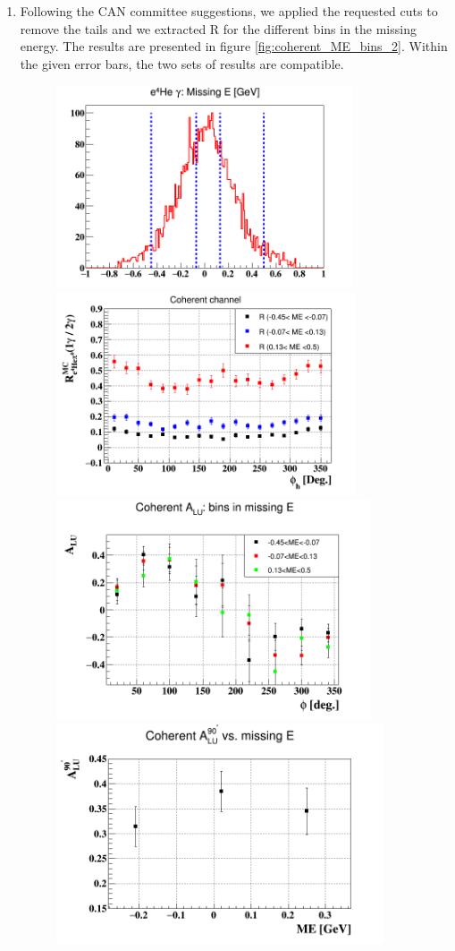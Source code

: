 \begin{enumerate}
\begin{enumerate}
 \item Following the CAN committee suggestions, we applied the requested cuts 
    to remove the tails and we extracted R for the different bins in the 
    missing energy. The results are presented in figure 
    \ref{fig:coherent_ME_bins_2}. Within the given error bars, the two sets of 
    results are compatible.   
    
    
    \begin{figure}[tbp]
   \includegraphics[height=6.0cm]{fig/new_ME_Coh_bins.png}
   \includegraphics[height=6.0cm]{fig/e4Hegamma_e4Hepi0_Phi_ME.png}
   \hspace{-3.0cm} \includegraphics[height=6.5cm]{fig/new_BSA_coherent_ME.png}
   \hspace{-1.0cm} \includegraphics[height=6.5cm]{fig/new_coh_ME_alpha.png}

\end{figure}
\end{enumerate}
\end{enumerate}
